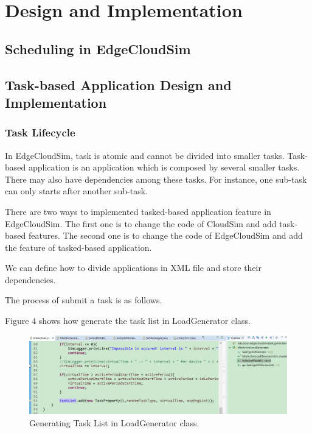 \section{Design and Implementation}

\subsection{Scheduling in EdgeCloudSim}


\subsection{Task-based Application Design and Implementation}

\subsubsection{Task Lifecycle}
In EdgeCloudSim, task is atomic and cannot be divided into smaller tasks. Task-based application is an application which is composed by several smaller tasks. There may also have dependencies among these tasks. For instance, one sub-task can only starts after another sub-task. 

There are two ways to implemented tasked-based application feature in EdgeCloudSim. The first one is to change the code of CloudSim and add task-based features. The second one is to change the code of EdgeCloudSim and add the feature of tasked-based application.

We can define how to divide applications in XML file and store their dependencies.

The process of submit a task is as follows.


Figure 4 shows how generate the task list in LoadGenerator class.
\begin{figure}
	\centering
	\includegraphics[width=1\textwidth]{./figures/Generate-task-LoadGenerator.png}
	\caption{\label{fig:frog}Generating Task List in LoadGenerator class.}
\end{figure}

